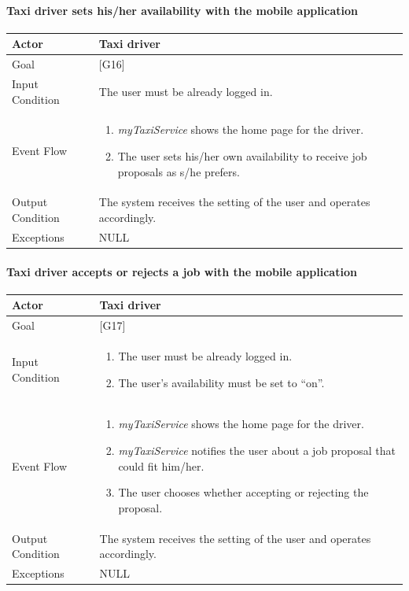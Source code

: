 \documentclass[a4paper,11pt]{report} %
\newcommand{\mts}{\mbox{\normalfont\itshape myTaxiService}}
\begin{document}
	\pagebreak
	
	\paragraph{Taxi driver sets his/her availability with the mobile application}
	\begin{center}
		\begin{tabular}{| l | p{9cm} |}\hline
			Actor & Taxi driver\\\hline
			Goal & {[}G16{]} \\\hline
			Input Condition & The user must be already logged in.\\\hline
			Event Flow & \begin{enumerate}
				\item \mts{} shows the home page for the driver.
				\item The user sets his/her own availability to receive job proposals as s/he prefers.
			\end{enumerate}\\\hline
			Output Condition & The system receives the setting of the user and operates accordingly.\\\hline
			Exceptions & NULL\\\hline
		\end{tabular}
	\end{center}
	
	\pagebreak
	
	\paragraph{Taxi driver accepts or rejects a job with the mobile application}
	\begin{center}
		\begin{tabular}{| l | p{9cm} |}\hline
			Actor & Taxi driver\\\hline
			Goal & {[}G17{]} \\\hline
			Input Condition & \begin{enumerate}
				\item The user must be already logged in.
				\item The user's availability must be set to ``on''.
			\end{enumerate}\\\hline
			Event Flow & \begin{enumerate}
				\item \mts{} shows the home page for the driver.
				\item \mts{} notifies the user about a job proposal that could fit him/her.	
				\item The user chooses whether accepting or rejecting the proposal.
			\end{enumerate}\\\hline
			Output Condition & The system receives the setting of the user and operates accordingly.\\\hline
			Exceptions & NULL\\\hline
		\end{tabular}
	\end{center}
	
\end{document}
